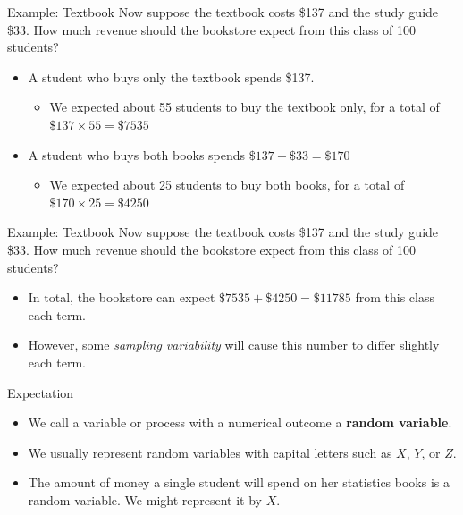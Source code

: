 \begin{frame}{Example: Textbook}
    Now suppose the textbook costs \$137 and the study guide \$33. How much revenue should the bookstore expect from this class of 100 students?
    
    \begin{itemize}
        \item A student who buys only the textbook spends \$137.
        \begin{itemize}
            \item We expected about 55 students to buy the textbook only, for a total of $\$137\times 55 = \$7535$
        \end{itemize}
        \item A student who buys both books spends $\$137 + \$33 = \$170$
        \begin{itemize}
            \item We expected about 25 students to buy both books, for a total of $\$170\times 25=\$4250$
        \end{itemize}
    \end{itemize}
\end{frame}

\begin{frame}{Example: Textbook}
    Now suppose the textbook costs \$137 and the study guide \$33. How much revenue should the bookstore expect from this class of 100 students?
    
    \begin{itemize}
        \item In total, the bookstore can expect $\$7535+\$4250=\$11785$ from this class each term. 
        \item However, some \textit{sampling variability} will cause this number to differ slightly each term.
    \end{itemize}
\end{frame}

\begin{frame}{Expectation}
    \begin{itemize}
        \item We call a variable or process with a numerical outcome a \textbf{random variable}.
        \item We usually represent random variables with capital letters such as $X$, $Y$, or $Z$. 
        \item The amount of money a single student will spend on her statistics books is a random variable. We might represent it by $X$.
    \end{itemize}
\end{frame}

